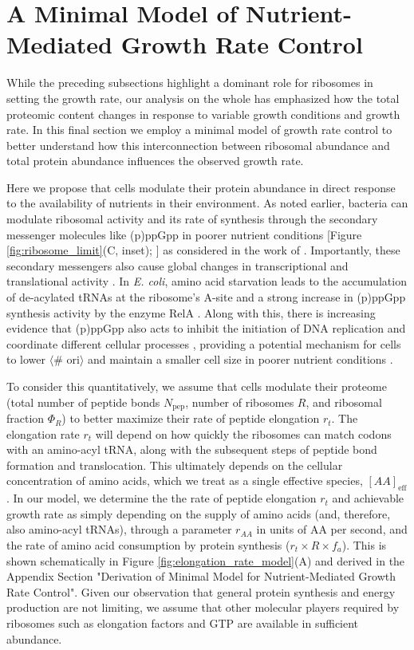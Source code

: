 \section{A Minimal Model of Nutrient-Mediated Growth Rate Control}
\label{sec:minimal_model}
While the preceding subsections highlight a dominant role for ribosomes in
setting the growth rate, our analysis on the whole has emphasized how the total
proteomic content changes in response to variable growth conditions and
growth rate. In this final section we employ a minimal model of growth rate control
to better understand how this interconnection between ribosomal abundance and
total protein abundance influences the observed growth rate.

Here we propose that cells modulate their protein abundance in direct response
to the availability of nutrients in their environment. As noted earlier,
bacteria can modulate ribosomal activity and its rate of synthesis through the
secondary messenger molecules like (p)ppGpp in poorer nutrient conditions
[Figure \ref{fig:ribosome_limit}(C, inset); \cite{dai2016}] as considered in the work of
\cite{bosdriesz2015}. Importantly, these secondary messengers also cause global
changes in transcriptional and translational activity \citep{hauryliuk2015,
zhu2019, Buke2020}. In \textit{E. coli}, amino acid starvation leads to the
accumulation of de-acylated tRNAs at the ribosome's A-site and a strong increase
in (p)ppGpp synthesis activity by the enzyme RelA \citep{hauryliuk2015}. Along
with this,  there is increasing evidence that (p)ppGpp also acts to inhibit the
initiation of DNA replication and coordinate different cellular processes
\citep{kraemer2019, vadia2017}, providing a potential mechanism for cells to
lower $\langle$\# ori$\rangle$ and maintain a smaller cell size in poorer
nutrient conditions \citep{fernandezcoll2020}.

To consider this quantitatively, we assume that cells modulate their proteome
(total number of peptide bonds $N_\text{pep}$, number of ribosomes $R$, and
ribosomal fraction $\Phi_R$) to better maximize their rate of peptide elongation
$r_t$. The elongation rate $r_t$ will depend on how quickly the ribosomes can
match codons with an amino-acyl tRNA, along with the subsequent steps of peptide
bond formation and translocation. This ultimately depends on the cellular
concentration of amino acids, which we treat as a single effective species,
$[AA]_\text{eff}$. In our model, we determine the the rate of peptide elongation
$r_t$ and achievable growth rate as simply depending on the supply of amino
acids (and, therefore, also amino-acyl tRNAs), through a parameter $r_{AA}$ in
units of AA per second, and the rate of amino acid consumption by protein
synthesis ($r_t \times R \times f_a$). This is shown schematically in
Figure \ref{fig:elongation_rate_model}(A) and derived in the Appendix Section "Derivation
of Minimal Model for Nutrient-Mediated Growth Rate Control". Given our
observation that general protein synthesis and energy production are not limiting, we
assume that other molecular players required by ribosomes such as elongation
factors and GTP are available in sufficient abundance.

